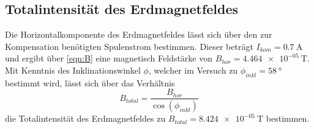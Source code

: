 \subsection{Totalintensität des Erdmagnetfeldes}
Die Horizontalkomponente des Erdmagnetfeldes lässt sich über den zur Kompensation benötigten Spulenstrom bestimmen. Dieser beträgt $I_{kom}= \SI{0.7}{\ampere}$ und ergibt über \ref{eqn:B} eine magnetisch Feldstärke von $B_{hor}=\SI{4.464e-05}{\tesla}$. Mit Kenntnis des Inklinationswinkel $\phi$, welcher im Versuch zu $\phi_{inkl}=\SI{58}{\degree}$ bestimmt wird, lässt sich über das Verhältnis
\begin{equation}
    B_{total}=\frac{B_{hor}}{\cos(\phi_{inkl})}
\end{equation} 
die Totalintensität des Erdmagnetfeldes zu $B_{total}=\SI{8.424e-05}{\tesla}$ bestimmen.



%
